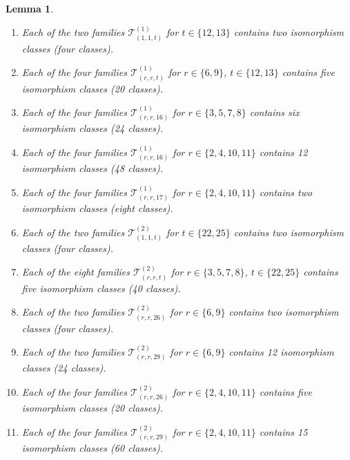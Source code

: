 \documentclass[dvipsnames]{article}
\newtheorem{lemma}[theorem]{Lemma}
\theoremstyle{definition}
\theoremstyle{remark}
\begin{document}
    \begin{lemma}\label{lem:non_type_preserving_numbers}
        \begin{enumerate}
            \item Each of the two families $\mathcal T_{(1,1,t)}^{(1)}$ for $t\in \{12,13\}$ contains two isomorphism classes (four classes).
            \item Each of the four families $\mathcal T_{(r,r,t)}^{(1)}$ for $r \in \{6,9\}$, $t\in \{12,13\}$ contains five isomorphism classes (20 classes).
            \item Each of the four families $\mathcal T_{(r,r,16)}^{(1)}$ for $r \in \{3,5,7,8\}$ contains six isomorphism classes (24 classes).
            \item Each of the four families $\mathcal T_{(r,r,16)}^{(1)}$ for $r \in \{2,4,10,11\}$ contains 12 isomorphism classes (48 classes).
            \item Each of the four families $\mathcal T_{(r,r,17)}^{(1)}$ for $r \in \{2,4,10,11\}$ contains two isomorphism classes (eight classes).
            \item Each of the two families $\mathcal T_{(1,1,t)}^{(2)}$ for $t\in \{22,25\}$ contains two isomorphism classes (four classes).
            \item Each of the eight families $\mathcal T_{(r,r,t)}^{(2)}$ for $r \in \{3,5,7,8\}$, $t\in \{22,25\}$ contains five isomorphism classes (40 classes).
            \item Each of the two families $\mathcal T_{(r,r,26)}^{(2)}$ for $r \in \{6,9\}$ contains two isomorphism classes (four classes).
            \item Each of the two families $\mathcal T_{(r,r,29)}^{(2)}$ for $r \in \{6,9\}$ contains 12 isomorphism classes (24 classes).
            \item Each of the four families $\mathcal T_{(r,r,26)}^{(2)}$ for $r \in \{2,4,10,11\}$ contains five isomorphism classes (20 classes).
            \item Each of the four families $\mathcal T_{(r,r,29)}^{(2)}$ for $r \in \{2,4,10,11\}$ contains 15 isomorphism classes (60 classes).
        \end{enumerate}
    \end{lemma}
\end{document}
